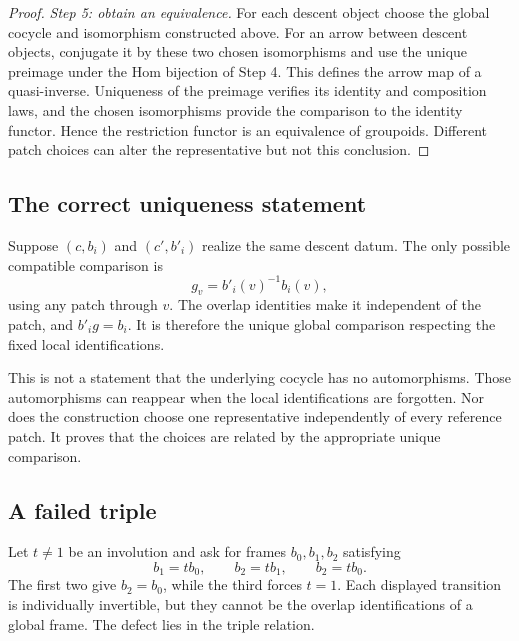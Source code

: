 \begin{proof}
\emph{Step 5: obtain an equivalence.} For each descent object choose the global cocycle and isomorphism constructed above. For an arrow between descent objects, conjugate it by these two chosen isomorphisms and use the unique preimage under the Hom bijection of Step 4. This defines the arrow map of a quasi-inverse. Uniqueness of the preimage verifies its identity and composition laws, and the chosen isomorphisms provide the comparison to the identity functor. Hence the restriction functor is an equivalence of groupoids. Different patch choices can alter the representative but not this conclusion.
\end{proof}

\subsection{The correct uniqueness statement}
Suppose \((c,b_i)\) and \((c',b'_i)\) realize the same descent datum. The only possible compatible comparison is
\[
 g_v=b'_i(v)^{-1}b_i(v),
\]
using any patch through \(v\). The overlap identities make it independent of the patch, and \(b'_ig=b_i\). It is therefore the unique global comparison respecting the fixed local identifications.

This is not a statement that the underlying cocycle has no automorphisms. Those automorphisms can reappear when the local identifications are forgotten. Nor does the construction choose one representative independently of every reference patch. It proves that the choices are related by the appropriate unique comparison.

\subsection{A failed triple}
Let \(t\ne1\) be an involution and ask for frames \(b_0,b_1,b_2\) satisfying
\[
 b_1=tb_0,\qquad b_2=tb_1,\qquad b_2=tb_0.
\]
The first two give \(b_2=b_0\), while the third forces \(t=1\). Each displayed transition is individually invertible, but they cannot be the overlap identifications of a global frame. The defect lies in the triple relation.

